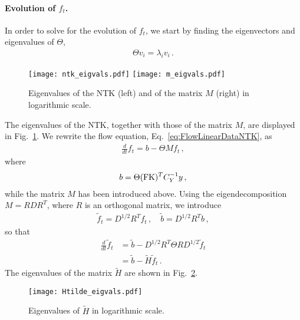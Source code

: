 \documentclass[11pt]{article}
\begin{document}
\paragraph{Evolution of $f_t$.}
In order to solve for the evolution of $f_t$, we start by finding the eigenvectors and eigenvalues of $\Theta$,
\begin{align}
    \label{eq:ThetaEigensystem}
    \Theta v_i = \lambda_i v_i\,.
\end{align}
\begin{figure}[!t]
  \centering
  \texttt{[image: ntk\_eigvals.pdf]}
  \texttt{[image: m\_eigvals.pdf]}
  \caption{Eigenvalues of the NTK (left)
    and of the matrix $M$ (right) in logarithmic scale.}
  \label{fig:NTKEigVals}
\end{figure}
The eigenvalues of the NTK, together with those of the matrix $M$, are displayed in
Fig.~\ref{fig:NTKEigVals}. We rewrite the flow equation, Eq.~\ref{eq:FlowLinearDataNTK}, as
\begin{align}
    \label{eq:ft_b_ThetaMft}
    \frac{d}{dt} f_t = b - \Theta M f_t\, , 
\end{align}
where 
\begin{align}
    \label{eq:Defb}
    b = \Theta (\mathrm{FK})^T C_Y^{-1} y\, ,
\end{align}
while the matrix $M$ has been introduced above.  Using the eigendecomposition $M = R D R^T$, 
where $R$ is an orthogonal matrix, we introduce 
\begin{align}
    \label{eq:RotatedF}
    \tilde{f}_t = D^{1/2} R^T f_t\, , \quad \tilde{b} = D^{1/2} R^T b\, ,
\end{align}
so that 
\begin{align}
    \label{eq:EvolutionRotatedF}
    \frac{d}{dt} \tilde{f}_t &= \tilde{b} - D^{1/2} R^T \Theta R D^{1/2} \tilde{f}_t \\
        &= \tilde{b} - \tilde{H} \tilde{f}_t\, .
\end{align}
The eigenvalues of the matrix $\tilde{H}$ are shown in Fig.~\ref{fig:Hevals}.
\begin{figure}[!ht]
    \centering
    \texttt{[image: Htilde\_eigvals.pdf]}
    \caption{Eigenvalues of $\tilde{H}$  
      in logarithmic scale.}
    \label{fig:Hevals}
  \end{figure}
\end{document}
